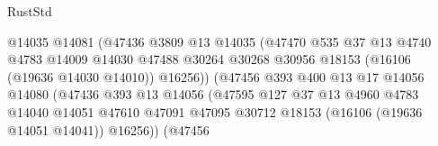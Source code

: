 \begin{lexlean}{RustStd}
\begin{coremodule}
                                            @14035
                                            @14081
                                            (@47436
                                              @3809
                                              @13
                                              @14035
                                              (@47470
                                                @535
                                                @37
                                                @13
                                                @4740
                                                @4783
                                                @14009
                                                @14030
                                                @47488
                                                @30264
                                                @30268
                                                @30956
                                                @18153
                                                (@16106 (@19636 @14030 @14010))
                                                @16256))
                                            (@47456
                                              @393
                                              @400
                                              @13
                                              @17
                                              @14056
                                              @14080
                                              (@47436
                                                @393
                                                @13
                                                @14056
                                                (@47595
                                                  @127
                                                  @37
                                                  @13
                                                  @4960
                                                  @4783
                                                  @14040
                                                  @14051
                                                  @47610
                                                  @47091
                                                  @47095
                                                  @30712
                                                  @18153
                                                  (@16106 (@19636 @14051 @14041))
                                                  @16256))
                                              (@47456

\end{coremodule}
\end{lexlean}
